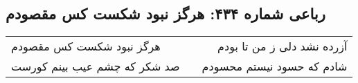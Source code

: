 \begin{center}
\section*{رباعی شماره ۴۳۴: هرگز نبود شکست کس مقصودم}
\label{sec:sh434}
\begin{longtable}{l p{0.5cm} r}
هرگز نبود شکست کس مقصودم
&&
آزرده نشد دلی ز من تا بودم
\\
صد شکر که چشم عیب بینم کورست
&&
شادم که حسود نیستم محسودم
\\
\end{longtable}
\end{center}
